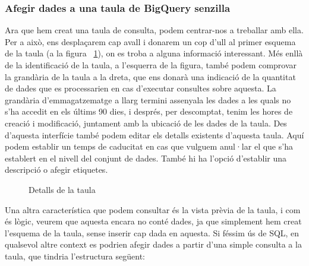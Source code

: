 \documentclass[12pt,longbibliography]{article}
\theoremstyle{definition}
\theoremstyle{remark}
\begin{document}
\subsubsection{Afegir dades a una taula de BigQuery senzilla}

Ara que hem creat una taula de consulta, podem centrar-nos a treballar amb ella. Per a això, ens desplaçarem cap avall i donarem un cop d'ull al primer esquema de la taula (a la figura ~\ref{fig:bq9}), on es troba a alguna informació interessant. Més enllà de la identificació de la taula, a l'esquerra de la figura, també podem comprovar la grandària de la taula a la dreta, que ens donarà una indicació de la quantitat de dades que es processarien en cas d'executar consultes sobre aquesta. La grandària d'emmagatzematge a llarg termini assenyala les dades a les quals no s'ha accedit en els últims 90 dies, i després, per descomptat, tenim les hores de creació i modificació, juntament amb la ubicació de les dades de la taula. Des d'aquesta interfície també podem editar els detalls existents d'aquesta taula. Aquí podem establir un temps de caducitat en cas que vulguem anul·lar el que s'ha establert en el nivell del conjunt de dades. També hi ha l'opció d'establir una descripció o afegir etiquetes.


\begin{figure}[h!]
\par
{}%
\hfill
{}%
\par

\caption{Detalls de la taula}
\label{fig:bq9}
\end{figure}


Una altra característica que podem consultar és la vista prèvia de la taula, i com és lògic, veurem que aquesta encara no conté dades, ja que simplement hem creat l'esquema de la taula, sense inserir cap dada en aquesta. Si féssim ús de SQL, en qualsevol altre context es podrien afegir dades a partir d'una simple consulta a la taula, que tindria l'estructura següent:
\end{document}
